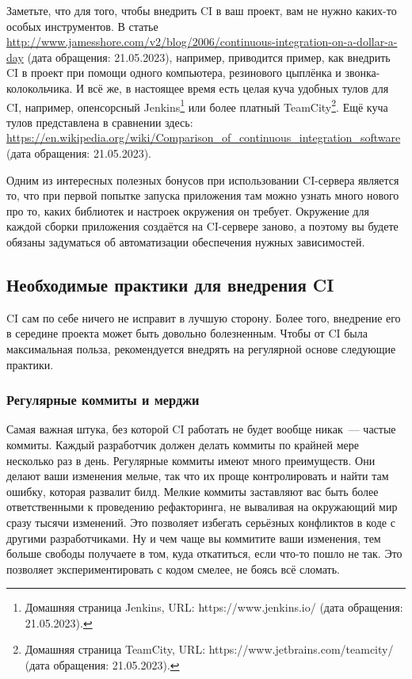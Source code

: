 \documentclass{../../text-style}
\begin{document}
Заметьте, что для того, чтобы внедрить CI в ваш проект, вам не нужно каких-то особых инструментов. В статье \url{http://www.jamesshore.com/v2/blog/2006/continuous-integration-on-a-dollar-a-day} (дата обращения: 21.05.2023), например, приводится пример, как внедрить CI в проект при помощи одного компьютера, резинового цыплёнка и звонка-колокольчика. И всё же, в настоящее время есть целая куча удобных тулов для CI, например, опенсорсный Jenkins\footnote{Домашняя страница Jenkins, URL: https://www.jenkins.io/ (дата обращения: 21.05.2023).} или более платный TeamCity\footnote{Домашняя страница TeamCity, URL: https://www.jetbrains.com/teamcity/ (дата обращения: 21.05.2023).}. Ещё куча тулов представлена в сравнении здесь: \url{https://en.wikipedia.org/wiki/Comparison_of_continuous_integration_software} (дата обращения: 21.05.2023).

Одним из интересных полезных бонусов при использовании CI-сервера является то, что при первой попытке запуска приложения там можно узнать много нового про то, каких библиотек и настроек окружения он требует. Окружение для каждой сборки приложения создаётся на CI-сервере заново, а поэтому вы будете обязаны задуматься об автоматизации обеспечения нужных зависимостей.

\subsection{Необходимые практики для внедрения CI}

CI сам по себе ничего не исправит в лучшую сторону. Более того, внедрение его в середине проекта может быть довольно болезненным. Чтобы от CI была максимальная польза, рекомендуется внедрять на регулярной основе следующие практики.

\subsubsection{Регулярные коммиты и мерджи}

Самая важная штука, без которой CI работать не будет вообще никак~--- частые коммиты. Каждый разработчик должен делать коммиты по крайней мере несколько раз в день. Регулярные коммиты имеют много преимуществ. Они делают ваши изменения мельче, так что их проще контролировать и найти там ошибку, которая развалит билд. Мелкие коммиты заставляют вас быть более ответственными к проведению рефакторинга, не вываливая на окружающий мир сразу тысячи изменений. Это позволяет избегать серьёзных конфликтов в коде с другими разработчиками. Ну и чем чаще вы коммитите ваши изменения, тем больше свободы получаете в том, куда откатиться, если что-то пошло не так. Это позволяет экспериментировать с кодом смелее, не боясь всё сломать.
\end{document}
